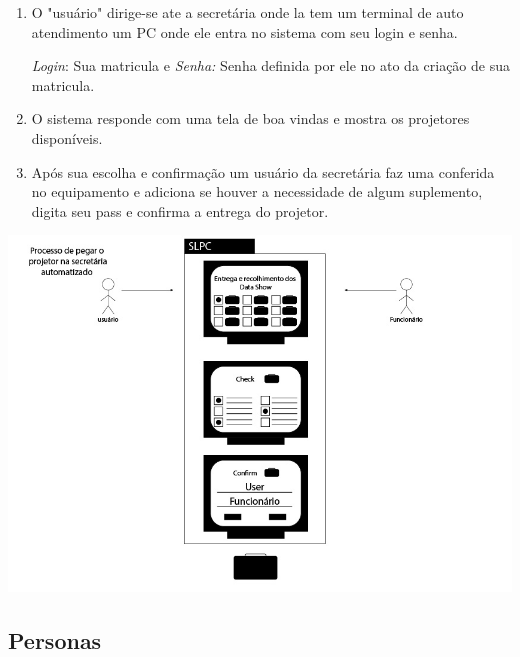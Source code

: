 \begin{enumerate}

  \item O "usuário" dirige-se ate a secretária onde la tem um terminal de auto
    atendimento um PC onde ele entra no sistema com seu login e senha.

    \textit{Login}: Sua matricula e \textit{Senha:} Senha definida por ele no
    ato da criação de sua matricula.

  \item O sistema responde com uma tela de boa vindas e mostra os projetores
    disponíveis. 

  \item Após sua escolha e confirmação um usuário da secretária faz uma
    conferida no equipamento e adiciona se houver a necessidade de algum
    suplemento, digita seu pass e confirma a entrega do projetor.


\end{enumerate}


\begin{center}

  \includegraphics[scale=0.5]{imagens/fluxo2.jpg}\\

\end{center}

\subsection{Personas}


